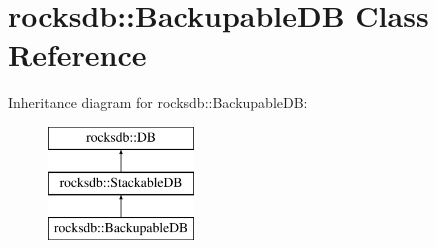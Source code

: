 \hypertarget{classrocksdb_1_1BackupableDB}{}\section{rocksdb\+:\+:Backupable\+DB Class Reference}
\label{classrocksdb_1_1BackupableDB}
Inheritance diagram for rocksdb\+:\+:Backupable\+DB\+:\begin{figure}[H]
\begin{center}
\leavevmode
\includegraphics[height=3.000000cm]{classrocksdb_1_1BackupableDB}
\end{center}
\end{figure}
